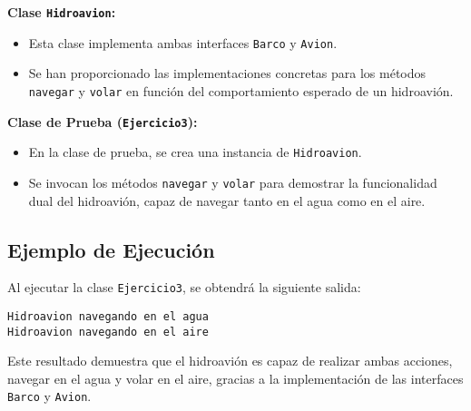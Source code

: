 \textbf{Clase \texttt{Hidroavion}:}
\begin{itemize}
  \item Esta clase implementa ambas interfaces \texttt{Barco} y \texttt{Avion}.
  \item Se han proporcionado las implementaciones concretas para los métodos \texttt{navegar} y \texttt{volar} en función del comportamiento esperado de un hidroavión.
\end{itemize}

\textbf{Clase de Prueba (\texttt{Ejercicio3}):}
\begin{itemize}
  \item En la clase de prueba, se crea una instancia de \texttt{Hidroavion}.
  \item Se invocan los métodos \texttt{navegar} y \texttt{volar} para demostrar la funcionalidad dual del hidroavión, capaz de navegar tanto en el agua como en el aire.
\end{itemize}

\subsection{Ejemplo de Ejecución}
Al ejecutar la clase \texttt{Ejercicio3}, se obtendrá la siguiente salida:
\begin{lstlisting}
Hidroavion navegando en el agua
Hidroavion navegando en el aire
\end{lstlisting}
Este resultado demuestra que el hidroavión es capaz de realizar ambas acciones, navegar en el agua y volar en el aire, gracias a la implementación de las interfaces \texttt{Barco} y \texttt{Avion}.
